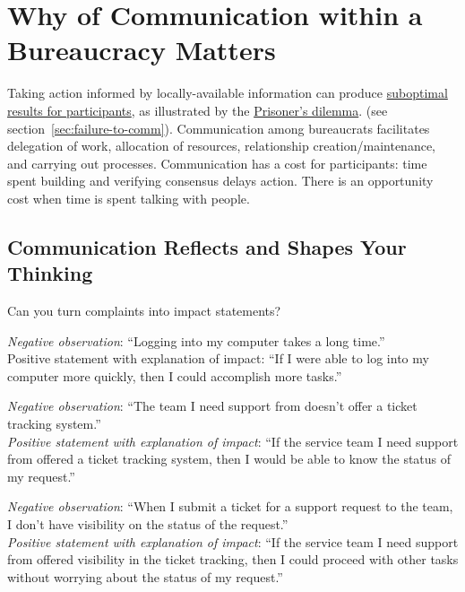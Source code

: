 \section{Why of Communication within a Bureaucracy Matters}

Taking action informed by locally-available information can produce \hyperref[sec:failure-to-comm]{suboptimal results for participants}, as illustrated by the
\href{https://en.wikipedia.org/wiki/Prisoner\%27s\_dilemma}{Prisoner's dilemma}.
\ifsectionref
(see section~\ref{sec:failure-to-comm}). 
\fi
Communication among bureaucrats facilitates delegation of work, allocation of resources, relationship creation/maintenance, and carrying out processes. Communication has a cost for participants: time spent building and verifying consensus delays action. There is an opportunity cost when time is spent talking with people.




\subsection*{Communication Reflects and Shapes Your Thinking}

Can you turn complaints into impact statements? 

\textit{Negative observation}: ``Logging into my computer takes a long time.''\\
Positive statement with explanation of impact: ``If I were able to log into my computer more quickly, then I could accomplish more tasks.''

\textit{Negative observation}: ``The team I need support from doesn't offer a ticket tracking system.''\\
\textit{Positive statement with explanation of impact}: ``If the service team I need support from offered a ticket tracking system, then I would be able to know the status of my request.''

\textit{Negative observation}: ``When I submit a ticket for a support request to the team, I don't have visibility on the status of the request.''\\
\textit{Positive statement with explanation of impact}: ``If the service team I need support from offered visibility in the ticket tracking, then I could proceed with other tasks without worrying about the status of my request.''


